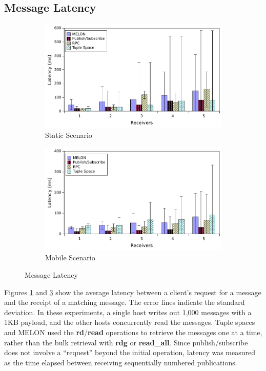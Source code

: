 \documentclass[lnicst]{svmultln}
\begin{document}
\subsection{Message Latency}

\begin{figure}
\centering

\begin{subfigure}{.5\textwidth}
\centering
\includegraphics[width = \linewidth, clip, trim = 0px 0px 0px 0px]{figures/latency_static.pdf}
\caption{Static Scenario}
\label{fig:latencystatic}
\end{subfigure}%
\begin{subfigure}{.5\textwidth}
\centering
\includegraphics[width = \linewidth, clip, trim = 0px 0px 0px 0px]{figures/latency_mobile.pdf}
\caption{Mobile Scenario}
\label{fig:latencymobile}
\end{subfigure}

\caption{Message Latency}
\end{figure}

Figures \ref{fig:latencystatic} and \ref{fig:latencymobile} show the average latency between a client's request for a message and the receipt of a matching message. The error lines indicate the standard deviation. In these experiments, a single host writes out 1,000 messages with a 1KB payload, and the other hosts concurrently read the messages. Tuple spaces and MELON used the \textbf{rd}/\textbf{read} operations to retrieve the messages one at a time, rather than the bulk retrieval with \textbf{rdg} or \textbf{read\_all}. Since publish/subscribe does not involve a ``request'' beyond the initial operation, latency was measured as the time elapsed between receiving sequentially numbered publications.
\end{document}
